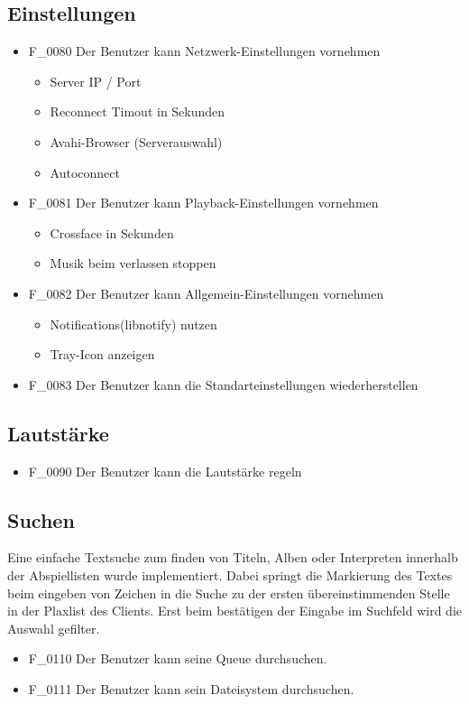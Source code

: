 \subsection{Einstellungen}
\begin{itemize}
	\item F\_0080 Der Benutzer kann Netzwerk-Einstellungen vornehmen
	\begin{itemize}
		\item Server IP / Port
		\item Reconnect Timout in Sekunden
		\item Avahi-Browser (Serverauswahl)
		\item Autoconnect
	\end{itemize}
	\item F\_0081 Der Benutzer kann Playback-Einstellungen vornehmen	
	\begin{itemize}
		\item Crossface in Sekunden
		\item Musik beim verlassen stoppen
	\end{itemize}
	\item F\_0082 Der Benutzer kann Allgemein-Einstellungen vornehmen
	\begin{itemize}
		\item Notifications(libnotify) nutzen
		\item Tray-Icon anzeigen
	\end{itemize}	
	\item F\_0083 Der Benutzer kann die Standarteinstellungen wiederherstellen
\end{itemize}
\subsection{Lautstärke}
\begin{itemize}
	\item F\_0090 Der Benutzer kann die Lautstärke regeln
\end{itemize}
\subsection{Suchen}
Eine einfache Textsuche zum finden von Titeln, Alben oder Interpreten innerhalb der 
Abspiellisten wurde implementiert. Dabei springt die Markierung des Textes beim 
eingeben von Zeichen in die Suche zu der ersten übereinstimmenden Stelle in der 
Plaxlist des Clients. Erst beim bestätigen der Eingabe im Suchfeld wird die Auswahl 
gefilter.
\begin{itemize}
	\item F\_0110 Der Benutzer kann seine Queue durchsuchen.
	\item F\_0111 Der Benutzer kann sein Dateisystem durchsuchen.
\end{itemize}
